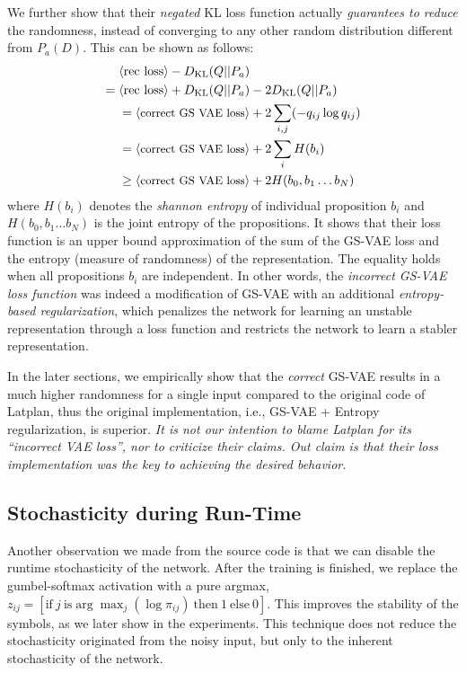 We further show that their \emph{negated} KL loss function
actually \emph{guarantees to reduce} the randomness,
instead of converging to any other random distribution different from $P_a(D)$.
This can be shown as follows:
\begin{align*} 
 \brackets{\text{rec loss}}-D_{\text{KL}}(Q||P_a) &                                   \\
=\brackets{\text{rec loss}}+D_{\text{KL}}(Q||P_a) &- 2 D_{\text{KL}}(Q||P_a)          \\
=\brackets{\text{\small correct GS VAE loss}}     & + 2 \sum_{i,j} (- q_{ij} \log q_{ij}) \\
=\brackets{\text{\small correct GS VAE loss}}     & + 2 \sum_{i} H(b_i)                   \\
\geq\brackets{\text{\small correct GS VAE loss}}  & + 2 H(b_0,b_1\ldots b_N)
\end{align*}
where $H(b_i)$ denotes the \emph{shannon entropy} of individual proposition $b_i$ and
$H(b_0,b_1\ldots b_N)$ is the joint entropy of the propositions.
It shows that their loss function is an upper bound approximation of
the sum of the GS-VAE loss and the entropy (measure of randomness) of the representation.
The equality holds when all propositions $b_i$ are independent.
% 
In other words,
the \emph{incorrect GS-VAE loss function}
was indeed a modification of GS-VAE with an additional \emph{entropy-based regularization},
which penalizes the network for learning an unstable representation
through a loss function and restricts the network to learn a stabler representation.

In the later sections, we empirically show that the \emph{correct} GS-VAE results in
a much higher randomness for a single input compared to the original code of Latplan,
thus the original implementation, i.e., GS-VAE + Entropy regularization, is superior.
% 
\emph{It is not our intention to blame Latplan for its ``incorrect VAE loss'',
nor to criticize their claims.
Out claim is that their loss implementation was the key to achieving the desired behavior.}

\subsection{Stochasticity during Run-Time}

Another observation we made from the source code is that we can
disable the runtime stochasticity of the network.
After the training is finished, we replace the gumbel-softmax activation with
a pure argmax,
$z_{ij} = [ \text{if}\ j\ \text{is} \arg \max_j (\log \pi_{ij})\ \text{then}\ 1\ \text{else}\ 0 ]$.
This improves the stability of the symbols, as we later show in the experiments.
% 
This technique does not reduce the stochasticity originated from the noisy input,
but only to the inherent stochasticity of the network.

